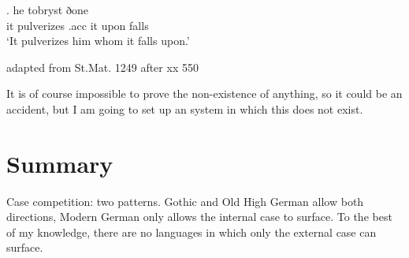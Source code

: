 \exg. he tobryst ðone    \\
 it pulverizes\scsub{[acc]} .\ac{acc}  it upon\scsub{[dat]} falls\\
`It pulverizes him whom it falls upon.' \label{ex:old-english}

 adapted from St.Mat. 1249 after xx  550

It is of course impossible to prove the non-existence of anything, so it could be an accident, but I am going to set up an system in which this does not exist.


\section{Summary}

Case competition: two patterns. Gothic and Old High German allow both directions, Modern German only allows the internal case to surface. To the best of my knowledge, there are no languages in which only the external case can surface.

